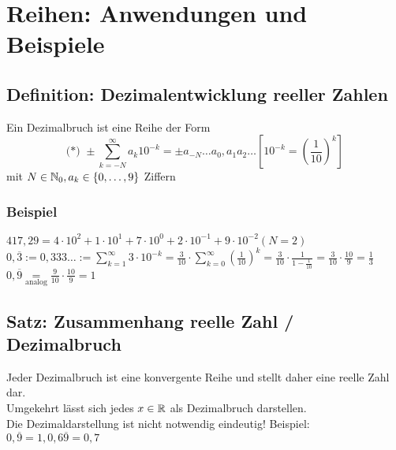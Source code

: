 \chapter{Reihen: Anwendungen und Beispiele}\label{P8}
\section{Definition: Dezimalentwicklung reeller Zahlen}\label{8.1}
Ein Dezimalbruch ist eine Reihe der Form
$$\text{(*) } \pm \sum_{k=-N}^\infty a_k 10^{-k} = \pm a_{-N} \ldots a_0, a_1 a_2 \ldots \left[10^{-k}=\left(\frac{1}{10}\right)^k\right]$$
mit $N \in \mathbb{N}_0, a_k \in \{0,\ldots,9\}$ Ziffern

\subsection*{Beispiel}
$417,29 = 4 \cdot 10^2 + 1 \cdot 10^1 + 7 \cdot 10^0 + 2 \cdot 10^{-1} + 9 \cdot 10^{-2} (N=2)$\\
$0,\overline{3} := 0,333\ldots := \sum_{k=1}^\infty 3 \cdot 10^{-k} = \frac{3}{10} \cdot \sum_{k=0}^\infty \left(\frac{1}{10}\right)^k = \frac{3}{10} \cdot \frac{1}{1-\frac{1}{10}} = \frac{3}{10} \cdot \frac{10}{9} = \frac{1}{3}$\\
$0,\overline{9} \underset{\text{analog}}{=} \frac{9}{10}\cdot\frac{10}{9}=1$

\newpage

\section{Satz: Zusammenhang reelle Zahl / Dezimalbruch}\label{8.2}
Jeder Dezimalbruch ist eine konvergente Reihe und stellt daher eine reelle Zahl dar.\\
Umgekehrt lässt sich jedes $x \in \mathbb{R}$ als Dezimalbruch darstellen.\\
Die Dezimaldarstellung ist nicht notwendig eindeutig! Beispiel: $0,\overline{9} = 1, 0,6\overline{9} = 0,7$

